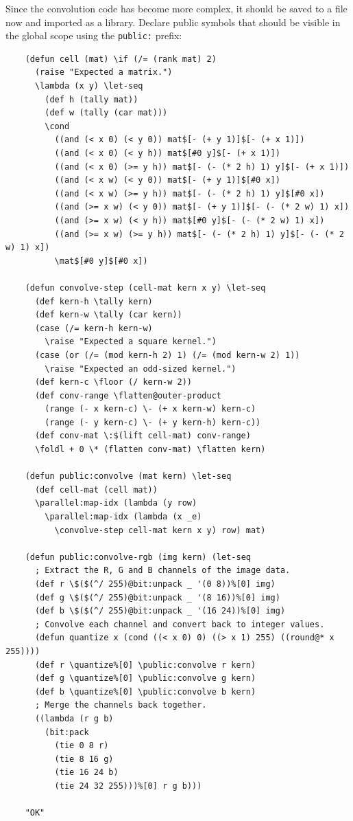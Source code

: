 Since the convolution code has become more complex, it should be saved to a file now and imported as a library. Declare public symbols that should be visible in the global scope using the \verb|public:| prefix:

\begin{Verbatim}
    (defun cell (mat) \if (/= (rank mat) 2)
      (raise "Expected a matrix.")
      \lambda (x y) \let-seq
        (def h (tally mat))
        (def w (tally (car mat)))
        \cond
          ((and (< x 0) (< y 0)) mat$[- (+ y 1)]$[- (+ x 1)])
          ((and (< x 0) (< y h)) mat$[#0 y]$[- (+ x 1)])
          ((and (< x 0) (>= y h)) mat$[- (- (* 2 h) 1) y]$[- (+ x 1)])
          ((and (< x w) (< y 0)) mat$[- (+ y 1)]$[#0 x])
          ((and (< x w) (>= y h)) mat$[- (- (* 2 h) 1) y]$[#0 x])
          ((and (>= x w) (< y 0)) mat$[- (+ y 1)]$[- (- (* 2 w) 1) x])
          ((and (>= x w) (< y h)) mat$[#0 y]$[- (- (* 2 w) 1) x])
          ((and (>= x w) (>= y h)) mat$[- (- (* 2 h) 1) y]$[- (- (* 2 w) 1) x])
          \mat$[#0 y]$[#0 x])
    
    (defun convolve-step (cell-mat kern x y) \let-seq
      (def kern-h \tally kern)
      (def kern-w \tally (car kern))
      (case (/= kern-h kern-w)
        \raise "Expected a square kernel.")
      (case (or (/= (mod kern-h 2) 1) (/= (mod kern-w 2) 1))
        \raise "Expected an odd-sized kernel.")
      (def kern-c \floor (/ kern-w 2))
      (def conv-range \flatten@outer-product
        (range (- x kern-c) \- (+ x kern-w) kern-c)
        (range (- y kern-c) \- (+ y kern-h) kern-c))
      (def conv-mat \:$(lift cell-mat) conv-range)
      \foldl + 0 \* (flatten conv-mat) \flatten kern)

    (defun public:convolve (mat kern) \let-seq
      (def cell-mat (cell mat))
      \parallel:map-idx (lambda (y row)
        \parallel:map-idx (lambda (x _e)
          \convolve-step cell-mat kern x y) row) mat)
    
    (defun public:convolve-rgb (img kern) (let-seq
      ; Extract the R, G and B channels of the image data.
      (def r \$($(^/ 255)@bit:unpack _ '(0 8))%[0] img)
      (def g \$($(^/ 255)@bit:unpack _ '(8 16))%[0] img)
      (def b \$($(^/ 255)@bit:unpack _ '(16 24))%[0] img)
      ; Convolve each channel and convert back to integer values.
      (defun quantize x (cond ((< x 0) 0) ((> x 1) 255) ((round@* x 255))))
      (def r \quantize%[0] \public:convolve r kern)
      (def g \quantize%[0] \public:convolve g kern)
      (def b \quantize%[0] \public:convolve b kern)
      ; Merge the channels back together.
      ((lambda (r g b)
        (bit:pack
          (tie 0 8 r)
          (tie 8 16 g)
          (tie 16 24 b)
          (tie 24 32 255)))%[0] r g b)))

    "OK"
\end{Verbatim}


